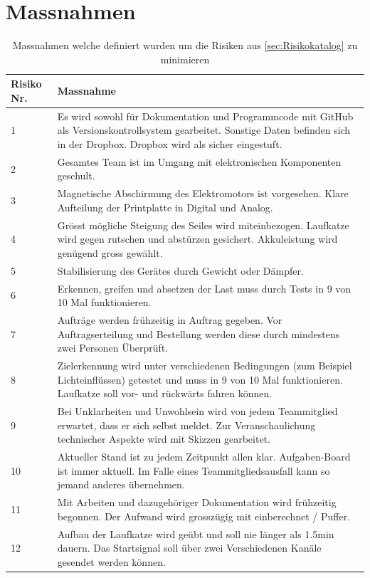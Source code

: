 \documentclass[a4paper]{report}
\begin{document}
\section{Massnahmen}
\label{sec:Massnahmen}
\vspace{1em}
\noindent
\begin{table}[h!]
	\centering
	\begin{tabular}{|p{}|p{}|}
		\hline
		\textbf{Risiko Nr.} & \textbf{Massnahme} \\
		\hline
		1 & Es wird sowohl für Dokumentation und Programmcode mit GitHub als Versionskontrollsystem gearbeitet. Sonstige Daten befinden sich in der Dropbox. Dropbox wird als sicher eingestuft. \\
		\hline
		2 & Gesamtes Team ist im Umgang mit elektronischen Komponenten geschult. \\
		\hline
		3 & Magnetische Abschirmung des Elektromotors ist vorgesehen. Klare Aufteilung der Printplatte in Digital und Analog. \\
		\hline
		4 & Grösst mögliche Steigung des Seiles wird miteinbezogen. Laufkatze wird gegen rutschen und abstürzen gesichert. Akkuleistung wird genügend gross gewählt. \\
		\hline
		5 & Stabilisierung des Gerätes durch Gewicht oder Dämpfer. \\
		\hline
		6 & Erkennen, greifen und absetzen der Last muss durch Tests in 9 von 10 Mal funktionieren. \\
		\hline
		7 & Aufträge werden frühzeitig in Auftrag gegeben. Vor Auftragserteilung und Bestellung werden diese durch mindestens zwei Personen Überprüft.\\
		\hline
		8 & Zielerkennung wird unter verschiedenen Bedingungen (zum Beispiel Lichteinflüssen) getestet und muss in 9 von 10 Mal funktionieren. Laufkatze soll vor- und rückwärts fahren können. \\
		\hline
		9 & Bei Unklarheiten und Unwohlsein wird von jedem Teammitglied erwartet, dass er sich selbst meldet. Zur Veranschaulichung technischer Aspekte wird mit Skizzen gearbeitet. \\
		\hline
		10 & Aktueller Stand ist zu jedem Zeitpunkt allen klar. Aufgaben-Board ist immer aktuell. Im Falle eines Teammitgliedsausfall kann so jemand anderes übernehmen. \\
		\hline
		11 & Mit Arbeiten und dazugehöriger Dokumentation wird frühzeitig begonnen. Der Aufwand wird grosszügig mit einberechnet / Puffer. \\
		\hline
		12 & Aufbau der Laufkatze wird geübt und soll nie länger als 1.5min dauern. Das Startsignal soll über zwei Verschiedenen Kanäle gesendet werden können. \\
		\hline
	\end{tabular}
	\caption{Massnahmen welche definiert wurden um die Risiken aus \ref{sec:Risikokatalog} zu minimieren}
	\label{tab:Massnahmen}
\end{table}
\end{document}
